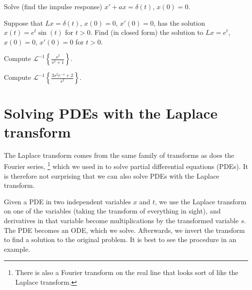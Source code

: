 \begin{exercise}
Solve (find the impulse response)
$x' + a x = \delta(t)$, $x(0) = 0$.
\end{exercise}

\begin{exercise}
Suppose that $L x = \delta(t)$, $x(0) = 0$, $x'(0) = 0$, has the solution
$x(t) = e^t \sin(t)$ for $t > 0$.  Find (in closed form) the solution to
$Lx = e^t$, $x(0) = 0$, $x'(0) = 0$ for $t > 0$.
\end{exercise}

\begin{exercise}
Compute
${\mathcal{L}}^{-1} \left\{ \frac{s^2}{s^2+1} \right\}$.
\end{exercise}

\begin{exercise}
Compute
${\mathcal{L}}^{-1} \left\{ \frac{3 s^2 e^{-s} + 2}{s^2} \right\}$.
\end{exercise}


\sectionnewpage
\section{Solving PDEs with the Laplace transform}
\label{laplacepde:section}


The Laplace transform comes from the same family of transforms as does the
Fourier series,%
\footnote{There is also a Fourier transform
on the real line that looks sort of like the Laplace transform.}
which we used in  to solve partial differential
equations (PDEs).
It is therefore not surprising that we can also solve PDEs with the Laplace
transform.

Given a PDE in two independent variables $x$ and $t$,  we use the
Laplace transform on one of the variables (taking the transform
of everything in sight), and derivatives in that variable become
multiplications by the transformed variable $s$.
The PDE becomes an ODE\@, which we solve.
Afterwards, we invert the transform to find a solution to the original
problem.
It is best to see the procedure in an example.

